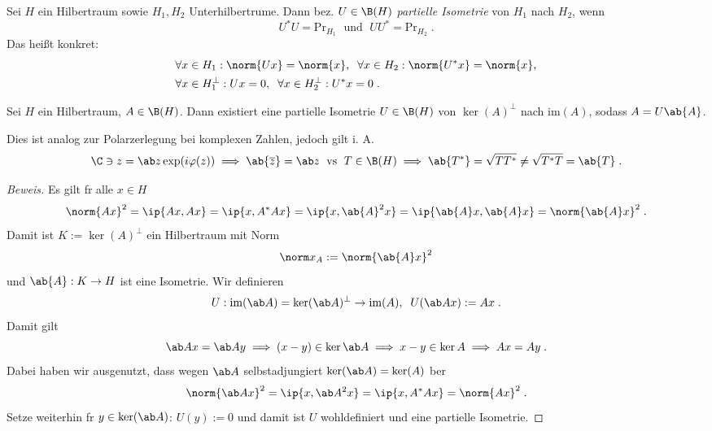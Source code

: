 \begin{definition}
	Sei $H$ ein Hilbertraum sowie \(H_1, H_2\) Unterhilbertr\as ume. Dann bez. \(U\in \B(H)\) \textit{partielle Isometrie} von $H_1$ nach $H_2$, wenn 
	\[U^*U = \text{Pr}_{H_1} \;\text{ und }\; UU^* = \text{Pr}_{H_2}\;.\]
	Das hei\ss{}t konkret:
	\begin{align*}&\forall x\in H_1: \norm{Ux} = \norm{x},\;\;\forall x \in H_2: \norm{U^*x} = \norm{x},\\
		&\forall x \in H_1^{\perp}: Ux = 0,\;\; \forall x \in H_2^\perp: U^*x = 0\;.\end{align*}
\end{definition}
\begin{theorem}
	Sei $H$ ein Hilbertraum, \(A\in \B(H)\). Dann existiert eine partielle Isometrie \(U\in \B(H)\) von \(\ker(A)^\perp \) nach \(\text{im}(A)\), sodass \(A = U \ab{A}\).
	\label{part_isom}
\end{theorem}
\begin{rem}
	Dies ist analog zur Polarzerlegung bei komplexen Zahlen, jedoch gilt i. A. 
	\[\C\ni z = \ab z \exp(i\varphi(z))\implies \ab{\overline z} = \ab z \;\text{ vs }\; T \in \B(H) \implies \ab{T^*} = \sqrt{TT^*} \neq \sqrt{T^*T} = \ab{T}\;.\]
\end{rem}
\begin{proof}[Beweis]
	Es gilt f\us r alle \(x\in H\)
	\[\norm{Ax}^2 = \ip{Ax, Ax} = \ip{x, A^*Ax} = \ip{x, \ab{A}^2 x} = \ip{\ab{A}x, \ab{A}x} = \norm{\ab{A}x}^2\;.\]
	Damit ist \(K:=\ker(A)^\perp\) ein Hilbertraum mit Norm 
	\[\norm x_A := \norm {\ab{A}x}^2\]
	und \(\ab{A}: K\to H\) ist eine Isometrie. Wir definieren
	\[U: \text{im}(\ab A) = \ker(\ab A)^\perp \to \text{im} (A),\;\; U(\ab A x ) := Ax\;.\]
	Damit gilt
	\[\ab A x = \ab A y \implies (x-y) \in \ker \ab A \implies x-y \in \ker A \implies Ax = Ay\;.\]
	Dabei haben wir ausgenutzt, dass wegen $\ab A$ selbstadjungiert \(\ker(\ab A) = \ker(A)\) \us ber
	\[\norm{\ab A x}^2 = \ip{x, \ab A^2 x} = \ip{x, A^*Ax}= \norm{Ax}^2\;. \]
	Setze weiterhin f\us r \(y\in \ker(\ab A)\):  \(U(y):=0\) und damit ist $U$ wohldefiniert und eine partielle Isometrie.
\end{proof}

